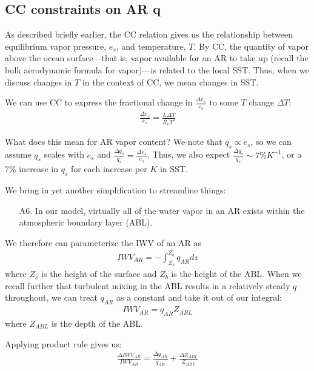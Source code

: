 \documentclass[letterpaper,12pt]{article}
\begin{document}

\subsection{CC constraints on AR q}

As described briefly earlier, the CC relation gives us the relationship between equilibrium vapor pressure, $e_s$, and temperature, $T$. By CC, the quantity of vapor above the ocean surface---that is, vapor available for an AR to take up (recall the bulk aerodynamic formula for vapor)---is related to the local SST. Thus, when we discuss changes in $T$ in the context of CC, we mean changes in SST. 

We can use CC to express the fractional change in $\frac{\Delta e_s}{e_s}$ to some $T$ change $\Delta T$: 
\begin{align}\label{eq:ccscale}
    \frac{\Delta e_s}{e_s} = \frac{L\Delta T}{R_vT^2}
\end{align}

What does this mean for AR vapor content? We note that $q_s \propto e_s$, so we can assume $q_s$ scales with $e_s$ and $\frac{\Delta q_s}{q_s} = \frac{\Delta e_s}{e_s}$. Thus, we also expect $\frac{\Delta q_s}{q_s} \sim 7\%K^{-1}$, or a 7\% increase in $q_s$ for each increase per $K$ in SST. 

We bring in yet another simplification to streamline things:
\begin{enumerate}
    \item[A6.] In our model, virtually all of the water vapor in an AR exists within the atmospheric boundary layer (ABL).
\end{enumerate}
We therefore can parameterize the IWV of an AR as
\begin{align}\label{eq:ARq1}
    IWV_{AR} = - \int_{Z_s}^{Z_b} q_{AR} dz
\end{align}
where $Z_s$ is the height of the surface and $Z_b$ is the height of the ABL. When we recall further that turbulent mixing in the ABL results in a relatively steady $q$ throughout, we can treat $q_{AR}$ as a constant and take it out of our integral:
\begin{align}\label{eq:Q_AR}
    IWV_{AR} = q_{AR} Z_{ABL}
\end{align}
where $Z_{ABL}$ is the depth of the ABL. 

Applying product rule gives us: 
\begin{align}\label{eq:Q_AR}
    \frac{\Delta IWV_{AR}}{IWV_{AR}} = \frac{\Delta q_{AR}}{q_{AR}} + \frac{\Delta Z_{ABL}}{Z_{ABL}}
\end{align}
\end{document}
